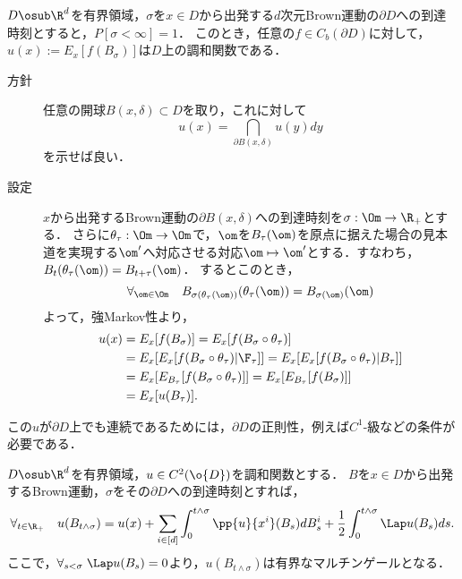 \documentclass[uplatex,dvipdfmx]{jsreport}
\begin{document}
\begin{proposition}[到達時刻による調和関数の構成]
    $D\osub\R^d$を有界領域，$\sigma$を$x\in D$から出発する$d$次元Brown運動の$\partial D$への到達時刻とすると，$P[\sigma<\infty]=1$．
    このとき，任意の$f\in C_b(\partial D)$に対して，$u(x):=E_x[f(B_\sigma)]$は$D$上の調和関数である．
\end{proposition}
\begin{Proof}\mbox{}
    \begin{description}
        \item[方針] 任意の開球$B(x,\delta)\subset D$を取り，これに対して
        \[u(x)=\dint_{\partial B(x,\delta)}u(y)dy\]
        を示せば良い．
        \item[設定] $x$から出発するBrown運動の$\partial B(x,\delta)$への到達時刻を$\sigma:\Om\to\R_+$とする．
        さらに$\theta_\tau:\Om\to\Om$で，$\om$を$B_\tau(\om)$を原点に据えた場合の見本道を実現する$\om'$へ対応させる対応$\om\mapsto\om'$とする．すなわち，$B_t(\theta_\tau(\om))=B_{t+\tau}(\om)$．
        するとこのとき，
        \[\forall_{\om\in\Om}\quad B_{\sigma(\theta_\tau(\om))}(\theta_\tau(\om))=B_{\sigma(\om)}(\om)\]
        よって，強Markov性より，
        \begin{align*}
            u(x)&=E_x[f(B_\sigma)]=E_x[f(B_\sigma\circ\theta_\tau)]\\
            &=E_x[E_x[f(B_\sigma\circ\theta_\tau)|\F_\tau]]=E_x[E_x[f(B_\sigma\circ\theta_\tau)|B_\tau]]\\
            &=E_x[E_{B_\tau}[f(B_\sigma\circ\theta_\tau)]]=E_x[E_{B_\tau}[f(B_\sigma)]]\\
            &=E_x[u(B_\tau)].
        \end{align*}
    \end{description}
\end{Proof}
\begin{remark}
    この$u$が$\partial D$上でも連続であるためには，$\partial D$の正則性，例えば$C^1$-級などの条件が必要である．
\end{remark}

\begin{observation}
    $D\osub\R^d$を有界領域，$u\in C^2(\o{D})$を調和関数とする．
    $B$を$x\in D$から出発するBrown運動，$\sigma$をその$\partial D$への到達時刻とすれば，
    \[\forall_{t\in\R_+}\quad u(B_{t\land\sigma})=u(x)+\sum_{i\in[d]}\int^{t\land\sigma}_0\pp{u}{x^i}(B_s)dB_s^i+\frac{1}{2}\int^{t\land\sigma}_0\Lap u(B_s)ds.\]
    ここで，$\forall_{s<\sigma}\;\Lap u(B_s)=0$より，$u(B_{t\land\sigma})$は有界なマルチンゲールとなる．
\end{observation}
\end{document}
